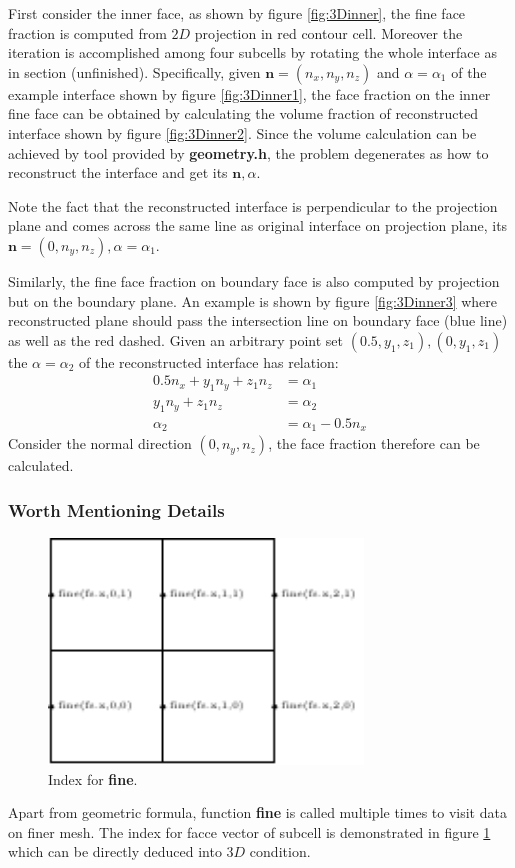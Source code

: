 \documentclass[a4paper]{article}
\newcommand{\func}[1]{\textbf{\textcolor{function}{#1}}}
\begin{document}
First consider the inner face, as shown by figure \ref{fig:3Dinner}, the fine face fraction is computed from $2D$ projection in red contour cell. Moreover the iteration is accomplished among four subcells by rotating the whole interface as in section (unfinished). Specifically, 
given $\mathbf{n}=(n_x,n_y,n_z)$ and $\alpha=\alpha_1$ of the example interface shown by figure \ref{fig:3Dinner1}, the face fraction on the inner fine face can be obtained by calculating the volume fraction of reconstructed interface shown by figure \ref{fig:3Dinner2}. Since the volume calculation can be achieved by tool provided by \textbf{geometry.h}, the problem degenerates as how to reconstruct the interface and get its $\mathbf{n},\alpha$.\par

Note the fact that the reconstructed interface is perpendicular to the projection plane and comes across the same line as original interface on projection plane, its $\mathbf{n}=(0,n_y,n_z), \alpha=\alpha_1$.\par

Similarly, the fine face fraction on boundary face is also computed by projection but on the boundary plane. An example is shown by figure \ref{fig:3Dinner3} where reconstructed plane should pass the intersection line on boundary face (blue line) as well as the red dashed. Given an arbitrary point set $(0.5,y_1,z_1),(0,y_1,z_1)$ the $\alpha=\alpha_2$ of the reconstructed interface has relation:
\begin{align}
    0.5n_x+y_1n_y+z_1n_z &= \alpha_1\\
    y_1n_y+z_1n_z &= \alpha_2\\
    \alpha_2 &= \alpha_1-0.5n_x\label{equ:alphabf}
\end{align}
Consider the normal direction $(0,n_y,n_z)$, the face fraction therefore can be calculated.
\newpage
\subsubsection{Worth Mentioning Details}
\begin{figure}[hp]
    \centering
    \includegraphics[height=6cm]{image/fine.pdf}
    \caption{Index for \func{fine}.}
    \label{fig:finefunc}
\end{figure}
Apart from geometric formula, function \func{fine} is called multiple times to visit data on finer mesh. The index for facce vector of subcell is demonstrated in figure \ref{fig:finefunc} which can be directly deduced into $3D$ condition.
\end{document}
